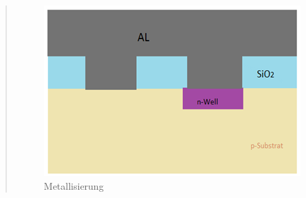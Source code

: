 \begin{quote}
    		\begin{figure}[H]
				\hspace{3 cm}
                  \includegraphics[scale=1, trim = 0cm 0cm 0cm 0cm,clip]
                	{./HerstellungBilder/Wafer02NachderMetallisierung.png}
                  \caption{Metallisierung}
                \label{fig:metall}
            \end{figure}

    	\vspace{2em}


\end{quote}
